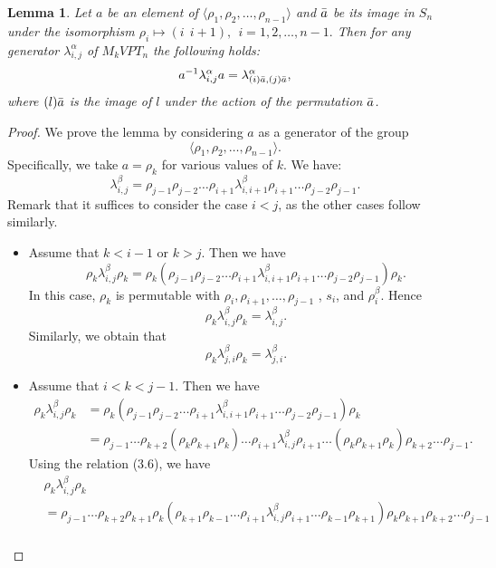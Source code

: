 \documentclass[preprint]{elsarticle}
\newtheorem{lemma}[theorem]{Lemma}
\begin{document}
\begin{lemma}
   Let $a$ be an element of $\big \langle \rho_1,\rho_2,\dots, \rho_{n-1} \rangle $ and $\Bar{a}$ be its image in $S_n$ under the isomorphism $\rho_i \mapsto (i \ \ i+1), ~~i=1,2,\dots,n-1.$ Then for any generator $\lambda_{i,j}^{\alpha}$ of $M_kVPT_n$ the following holds: \[ a^{-1} \lambda_{i,j}^{\alpha} a = \lambda_{(i)\Bar{a},(j)\Bar{a}}^{\alpha} , \] where $(l)\Bar{a}$ is the image of $l$ under the action of the permutation $\Bar{a}$.
\end{lemma}

\begin{proof}
    We prove the lemma by considering $a$ as a generator of the group $$\big \langle \rho_1,\rho_2,\dots, \rho_{n-1} \rangle .$$ Specifically, we take $a=\rho_k$ for various values of $k$. We have:
    \[
     \lambda_{i,j}^{\beta} = \rho_{j-1} \rho_{j-2} \dots \rho_{i+1} \lambda_{i,i+1}^{\beta} \rho_{i+1}\dots \rho_{j-2} \rho_{j-1}.
    \]
Remark that it suffices to consider the case \(i<j\), as the other cases follow similarly.
\begin{itemize}
        \item[(a)] Assume that $k<i-1$ or $k>j.$ Then we have
        \[
        \rho_k \lambda_{i,j}^{\beta} \rho_k = \rho_k (\rho_{j-1} \rho_{j-2} \dots \rho_{i+1} \lambda_{i,i+1}^{\beta} \rho_{i+1}\dots \rho_{j-2} \rho_{j-1})\rho_k.
        \]
        In this case, $\rho_k$ is permutable with $\rho_i,\rho_{i+1}, \dots,\rho_{j-1}$ , $s_i$, and $\rho_i^{\beta}$. Hence 
        \[
        \rho_k \lambda_{i,j}^{\beta} \rho_k = \lambda_{i,j}^{\beta}.
        \]
        Similarly, we obtain that 
        $$\rho_k \lambda_{j,i}^{\beta} \rho_k = \lambda_{j,i}^{\beta}.$$ 
        \item[(b)] Assume that $i<k<j-1$. Then we have
        \begin{align*}
            \rho_k \lambda_{i,j}^{\beta} \rho_k &= \rho_k (\rho_{j-1} \rho_{j-2} \dots \rho_{i+1} \lambda_{i,i+1}^{\beta} \rho_{i+1}\dots \rho_{j-2} \rho_{j-1})\rho_k\\
            &=\rho_{j-1} \dots  \rho_{k+2}(\rho_{k}\rho_{k+1}\rho_{k})\dots\rho_{i+1} \lambda_{i,j}^{\beta}\rho_{i+1}\dots (\rho_{k}\rho_{k+1}\rho_{k}) \rho_{k+2} \dots \rho_{j-1}.
        \end{align*}
        Using the relation (3.6), we have
        \begin{align*}
        & \rho_k \lambda_{i,j}^{\beta} \rho_k \\
            &= \rho_{j-1} \dots  \rho_{k+2}\rho_{k+1}\rho_{k} (\rho_{k+1}\rho_{k-1} \dots \rho_{i+1}\lambda_{i,j}^{\beta}\rho_{i+1}\dots \rho_{k-1}\rho_{k+1})\rho_{k}\rho_{k+1} \rho_{k+2} \dots \rho_{j-1}\\

\end{align*}
\end{itemize}
\end{proof}
\end{document}
